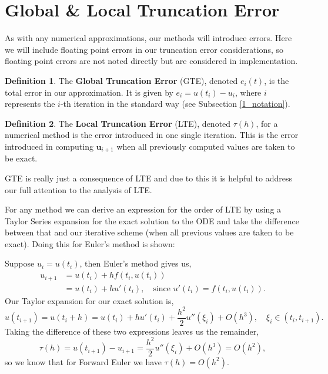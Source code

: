 \documentclass[12pt, twoside]{report}
\theoremstyle{plain}
\theoremstyle{definition}
\newtheorem{definition}{Definition}[chapter]
\theoremstyle{definition}
\begin{document}
    \section{Global \& Local Truncation Error}
    \label{2_error}
        As with any numerical approximations, our methods will introduce 
        errors. Here we will include floating point errors in our
        truncation error considerations, so floating point errors are not
        noted directly but are considered in implementation.

        \begin{definition}
            The \textbf{Global Truncation Error} (GTE), denoted $e_{i}(t)$,
            is the total error in our approximation. It is given by 
            $e_i=u(t_i) - u_i$, where $i$ represents the $i$-th iteration
            in the standard way (see Subsection \ref{1_notation}).
        \end{definition}

        \begin{definition}
            The \textbf{Local Truncation Error} (LTE), denoted $\tau (h)$,
            for a numerical method is the error introduced in one single 
            iteration. This is the error introduced in computing 
            $\mathbf{u}_{i+1}$ when all previously computed values are taken 
            to be exact.
        \end{definition}

        GTE is really just a consequence of LTE and due to this it is helpful
        to address our full attention to the analysis of LTE.
        
        For any method we can derive an expression for the order of LTE by 
        using a Taylor Series expansion for the exact solution to the ODE and
        take the difference between that and our iterative scheme (when all 
        previous values are taken to be exact). Doing this for Euler's method 
        is shown:
        
        Suppose $u_i = u(t_i)$, then Euler's method gives us, 
        \begin{equation}
            \begin{split}
                u_{i+1} &= u(t_i) + hf(t_i, u(t_i)) \\
                &= u(t_i) + hu'(t_i),\quad
                \text{since } u'(t_i) = f(t_i, u(t_i)).
            \end{split}
        \end{equation}
        Our Taylor expansion for our exact solution is,
        \begin{equation}
            u(t_{i+1}) = u(t_i + h) = u(t_i) + hu'(t_i) + \frac{h^2}{2} 
            u''(\xi_i) + O(h^3), \quad \xi_i \in (t_i, t_{i+1}).
        \end{equation}
        Taking the difference of these two expressions leaves us the remainder,
        \begin{equation}
            \tau(h) = u(t_{i+1}) - u_{i+1} = \frac{h^2}{2} u''(\xi_i) + 
            O(h^3) = O(h^2),
        \end{equation}
        so we know that for Forward Euler we have $\tau(h)=O(h^2)$.
\end{document}
